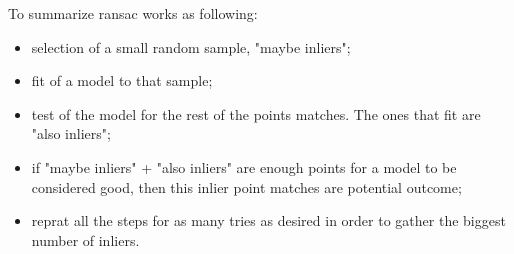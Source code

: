 To summarize \acrshort{ransac} works as following:

\begin{itemize}
	\item selection of a small random sample, "maybe inliers";
	\item fit of a model to that sample;
	\item test of the model for the rest of the points matches. The ones that fit are "also inliers";
	\item if "maybe inliers" + "also inliers" are enough points for a model to be considered good, then this inlier point matches are potential outcome;
	\item reprat all the steps for as many tries as desired in order to gather the biggest number of inliers.
\end{itemize}

